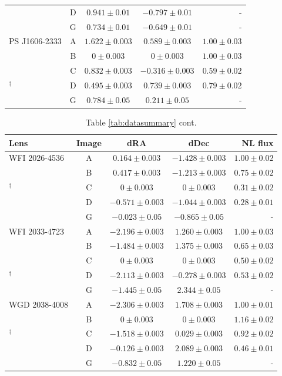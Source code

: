\begin{table}
\begin{tabular}{lcccr}
		& D & $0.941 \pm 0.01$ & $-0.797 \pm 0.01$ & - \\
		& G & $0.734 \pm 0.01$ & $-0.649 \pm 0.01$& - \\ 
		\hline
		PS J1606-2333 & A & $1.622 \pm 0.003$& $0.589 \pm 0.003$ & $1.00 \pm 0.03$\\
		\cite{Nierenberg++19}& B & $0 \pm 0.003$& $0 \pm 0.003$ & $1.00 \pm 0.03$\\
		\cite{Shajib++18}& C & $0.832 \pm 0.003$& $-0.316 \pm 0.003$ & $0.59 \pm 0.02$ \\
		$^{\dagger}$\cite{Lemon++18}& D  & $0.495 \pm 0.003$& $0.739 \pm 0.003$ & $0.79 \pm 0.02$ \\
		& G  & $0.784 \pm 0.05$& $0.211 \pm 0.05$ & - \\
		\hline
	\end{tabular}
\end{table}
\begin{table}
	\centering
	\caption{Table \ref{tab:datasummary} cont.}
	\label{tab:datasummarycont}
	\begin{tabular}{lcccr} 
		\hline
		Lens & Image & dRA & dDec & NL flux \\
		\hline
		WFI 2026-4536 & A & $0.164 \pm 0.003$& $-1.428 \pm 0.003$ & $1.00 \pm 0.02$ \\
		\cite{Nierenberg++19}& B & $0.417\pm 0.003$& $-1.213 \pm 0.003$ & $0.75 \pm 0.02$ \\
		$^{\dagger}$\cite{Morgan++04}& C & $0\pm 0.003$& $0 \pm 0.003$ & $0.31 \pm 0.02$ \\
		& D & $-0.571 \pm 0.003$& $-1.044 \pm 0.003$ & $0.28 \pm 0.01$ \\
		& G & $-0.023 \pm 0.05$ & $-0.865 \pm 0.05$ & - \\
		\hline
		WFI 2033-4723 & A & $-2.196 \pm 0.003$& $1.260 \pm 0.003$ & $1.00 \pm 0.03$ \\
		\cite{Nierenberg++19}& B & $-1.484 \pm 0.003$& $1.375 \pm 0.003$ & $0.65 \pm 0.03$ \\
		\cite{Vuissoz++08}& C & $0\pm 0.003$& $0 \pm 0.003$ & $0.50 \pm 0.02$ \\
		$^{\dagger}$\cite{Morgan++04}& D & $-2.113 \pm 0.003$& $-0.278 \pm 0.003$ & $0.53 \pm 0.02$ \\
		& G & $-1.445 \pm 0.05$& $2.344 \pm 0.05$ & - \\
		\hline
		WGD 2038-4008 & A & $-2.306 \pm 0.003$& $1.708 \pm 0.003$ & $1.00 \pm 0.01$ \\
		\cite{Nierenberg++19}& B & $0\pm 0.003$& $0 \pm 0.003$ & $1.16 \pm 0.02$ \\
		$^{\dagger}$\cite{Agnello++18}& C & $-1.518 \pm 0.003$& $0.029 \pm 0.003$ & $0.92 \pm 0.02$ \\
		& D & $-0.126 \pm 0.003$& $2.089 \pm 0.003$ & $0.46 \pm 0.01$ \\
		& G & $-0.832 \pm 0.05$ & $1.220 \pm 0.05$ & - \\
		\hline
		
	\end{tabular}
\end{table}

